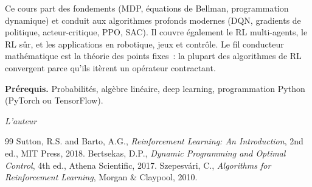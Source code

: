 \documentclass[12pt,a4paper,twoside]{book}
\theoremstyle{definition}
\theoremstyle{plain}
\theoremstyle{remark}
\begin{document}
\medskip

Ce cours part des fondements (MDP, \'equations de Bellman, programmation dynamique) et conduit aux algorithmes profonds modernes (DQN, gradients de politique, acteur-critique, PPO, SAC). Il couvre \'egalement le RL multi-agents, le RL s\^ur, et les applications en robotique, jeux et contr\^ole. Le fil conducteur math\'ematique est la th\'eorie des points fixes~: la plupart des algorithmes de RL convergent parce qu'ils it\`erent un op\'erateur contractant.

\medskip

\noindent\textbf{Pr\'erequis.} Probabilit\'es, alg\`ebre lin\'eaire, deep learning, programmation Python (PyTorch ou TensorFlow).

\vfill
\hfill\textit{L'auteur}


\mainmatter














\backmatter
\begin{thebibliography}{99}
 Sutton, R.S. and Barto, A.G., \emph{Reinforcement Learning: An Introduction}, 2nd ed., MIT Press, 2018.
 Bertsekas, D.P., \emph{Dynamic Programming and Optimal Control}, 4th ed., Athena Scientific, 2017.
 Szepesv\'ari, C., \emph{Algorithms for Reinforcement Learning}, Morgan \& Claypool, 2010.
\end{thebibliography}
\printindex
\end{document}
